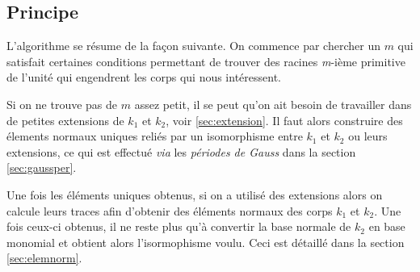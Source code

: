 \documentclass[a4paper]{article} %
\numberwithin{section}{part}
\numberwithin{equation}{section}
\newcommand\nroot[1]{\textit{#1}-ième}
\newcommand\GF[1]{\mathbb{F}_{#1}}
\begin{document}
\subsection{Principe}

L'algorithme se résume de la façon suivante. On commence par chercher un $m$ qui
satisfait certaines conditions permettant de trouver des racines \nroot{m}
primitive de l'unité qui engendrent les corps qui nous intéressent.\par
Si on ne trouve pas de $m$ assez petit, il se peut qu'on ait besoin de
travailler dans de petites extensions de $k_1$ et $k_2$, voir
\ref{sec:extension}. Il faut alors construire des élements normaux uniques 
reliés par un isomorphisme entre $k_1$ et $k_2$ ou leurs extensions, ce qui est
effectué \textit{via} les \emph{périodes de Gauss} dans la section 
\ref{sec:gaussper}.\par
Une fois les éléments uniques obtenus, si on a utilisé des extensions alors on
calcule leurs traces afin d'obtenir des éléments normaux des corps $k_1$ et 
$k_2$. Une fois ceux-ci obtenus, il ne reste plus qu'à convertir la base normale
de $k_2$ en base monomial et obtient alors l'isormophisme voulu. Ceci est
détaillé dans la section \ref{sec:elemnorm}.



\iffalse

En attendant un algorithme plus détaillé, on peut résumer la recherche d'un
élément normal unique de la façon suivante :
\vspace{0.3cm}
\begin{enumerate}[(1)]
\item Trouver un polynôme $h$ de degré $o$ irréductible sur $\GF{q}$ et tel que 
$(o, n) = 1$.

\item Construire l'extension de degré $o$, $k'_1 = k_1[x]/h(x)$.

\item Chercher une racine primitive \nroot{m} $\zeta_m$ dans $k'_1$.

\item Calculer la periode de Gauss de $\zeta_m$.
\end{enumerate}
\vspace{0.3cm}
Les points (1) et (2) ne seront nécessaires que lorsqu'on aura besoin d'utiliser
une extension pour trouver le paramètre $m$ assez petit. Il sera bien possible
que $o = 1$ comme on le montrera dans la sous-section \textit{(la dernière
probablement)}. Le point (3) a déjà été évoqué pour la méthode de Pinch, à ceci
pèrs qu'il faudra rajouter $m$ sans facteur carré. Et le point (4) sera traité 
dans la sous-section \ref{sec:gaussper} comme il a été mentionné plus haut. On 
répète exactement le même processus pour $k_2$, reste alors à calculer l'image 
de $x$ par l'isomorphisme reliant les deux éléments normaux. C'est ce qui va 
être étudier dans la sous-section qui suit.
\fi
\end{document}
